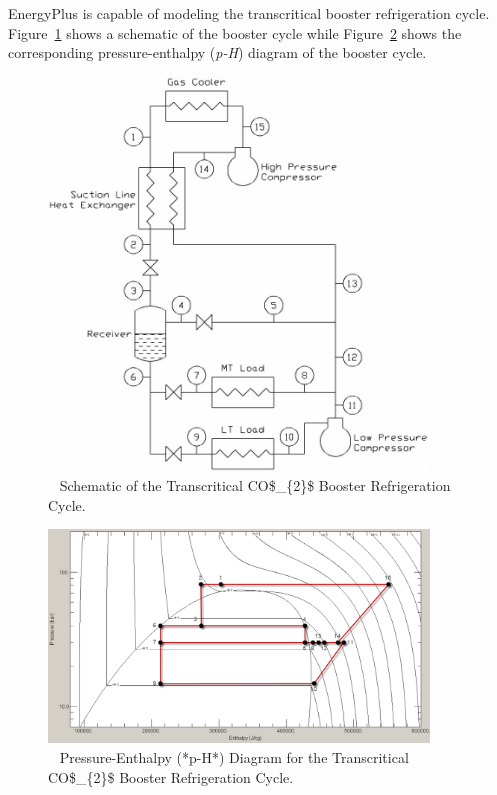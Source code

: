 EnergyPlus is capable of modeling the transcritical booster refrigeration cycle. Figure~\ref{fig:schematic-of-the-transcritical-co_2-booster} shows a schematic of the booster cycle while Figure~\ref{fig:pressure-enthalpy-p-h-diagram-for} shows the corresponding pressure-enthalpy (\emph{p-H}) diagram of the booster cycle.

\begin{figure}[hbtp] %
\centering
\includegraphics[width=0.9\textwidth, height=0.9\textheight, keepaspectratio=true]{media/image6337.png}
\caption{  Schematic of the Transcritical CO\$\_\{2\}\$ Booster Refrigeration Cycle. \protect \label{fig:schematic-of-the-transcritical-co_2-booster}}
\end{figure}

\begin{figure}[hbtp] %
\centering
\includegraphics[width=0.9\textwidth, height=0.9\textheight, keepaspectratio=true]{media/image6338.png}
\caption{  Pressure-Enthalpy (*p-H*) Diagram for the Transcritical CO\$\_\{2\}\$ Booster Refrigeration Cycle. \protect \label{fig:pressure-enthalpy-p-h-diagram-for}}
\end{figure}

